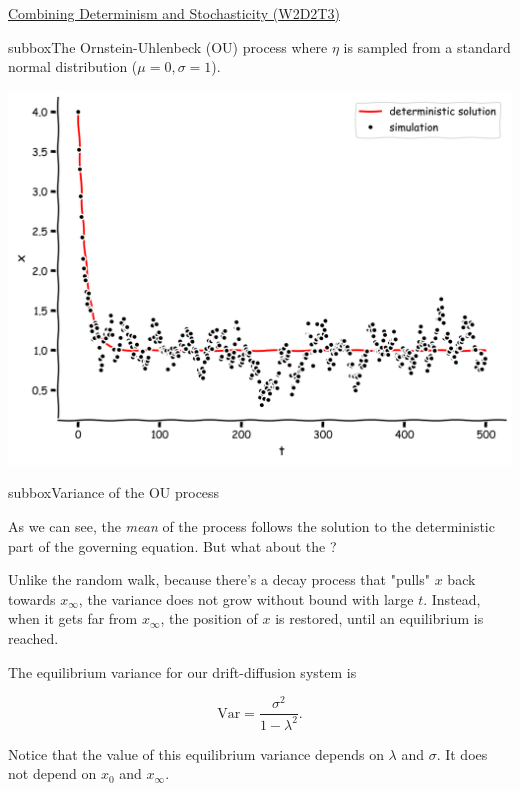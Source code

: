 \begin{textbox}{\href{https://compneuro.neuromatch.io/tutorials/W2D2_LinearSystems/student/W2D2_Tutorial3.html}{Combining Determinism and Stochasticity (W2D2T3)} }
\begin{subbox}{subbox}{The Ornstein-Uhlenbeck (OU) process}
where $\eta$ is sampled from a standard normal distribution ($\mu=0, \sigma=1$). 
\begin{center}
\includegraphics[scale=0.08]{Figures/LS/CDS_Figure7.png}
\end{center}
\end{subbox}
\begin{subbox}{subbox}{Variance of the OU process}
\scriptsize

As we can see, the \textit{mean} of the process follows the solution to the deterministic part of the governing equation. But what about the ? 

Unlike the random walk, because there's a decay process that "pulls" $x$ back towards $x_\infty$, the variance does not grow without bound with large $t$. Instead, when it gets far from $x_\infty$, the position of $x$ is restored, until an equilibrium is reached.

The equilibrium variance for our drift-diffusion system is

\[\text{Var} = \frac{\sigma^2}{1 - \lambda^2}.\]

Notice that the value of this equilibrium variance depends on $\lambda$ and $\sigma$. It does not depend on $x_0$ and $x_\infty$.

\end{subbox}

\end{textbox}

